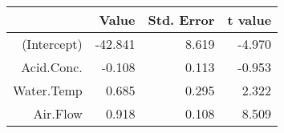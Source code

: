 \begin{table}[ht]
\centering
\begin{tabular}{rrrr}
  \hline
 & Value & Std. Error & t value \\ 
  \hline
(Intercept) & -42.841 & 8.619 & -4.970 \\ 
  Acid.Conc. & -0.108 & 0.113 & -0.953 \\ 
  Water.Temp & 0.685 & 0.295 & 2.322 \\ 
  Air.Flow & 0.918 & 0.108 & 8.509 \\ 
   \hline
\end{tabular}
\end{table}
